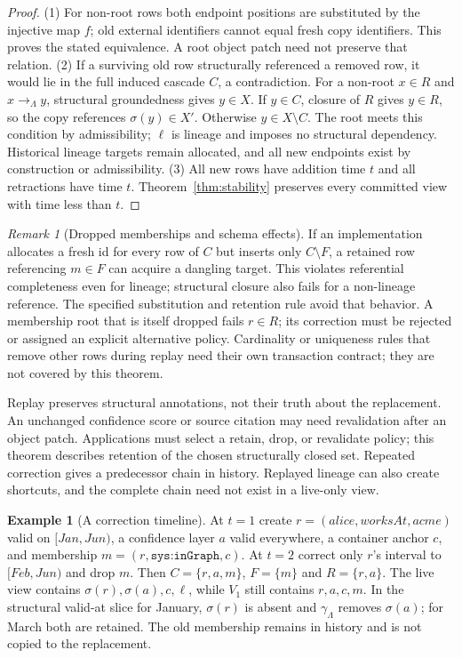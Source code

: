 \documentclass[11pt]{article}
\theoremstyle{plain}
\theoremstyle{definition}
\newtheorem{example}{Example}
\theoremstyle{remark}
\newtheorem{remark}{Remark}
\newcommand{\refs}{\rightarrow}          %
\newcommand{\core}{\gamma}               %
\newcommand{\sys}[1]{\texttt{sys:#1}}
\newcommand{\Lin}{\Lambda}               %
\begin{document}
\begin{proof}
(1) For non-root rows both endpoint positions are substituted by the injective
map $f$; old external identifiers cannot equal fresh copy identifiers. This
proves the stated equivalence. A root object patch need not preserve that relation.
(2) If a surviving old row structurally referenced a removed row, it would lie
in the full induced cascade $C$, a contradiction. For a non-root $x\in R$ and
$x\refs_{\Lin}y$, structural groundedness gives $y\in X$. If $y\in C$, closure
of $R$ gives $y\in R$, so the copy references $\sigma(y)\in X'$. Otherwise
$y\in X\setminus C$. The root meets this condition by admissibility; $\ell$ is
lineage and imposes no structural dependency. Historical lineage targets remain
allocated, and all new endpoints exist by construction or admissibility.
(3) All new rows have addition time $t$ and all retractions have time $t$.
Theorem~\ref{thm:stability} preserves every committed view with time less than $t$.
\end{proof}

\begin{remark}[Dropped memberships and schema effects]
If an implementation allocates a fresh id for every row of $C$ but inserts only
$C\setminus F$, a retained row referencing $m\in F$ can acquire a dangling target.
This violates referential completeness even for lineage; structural closure also
fails for a non-lineage reference. The specified substitution and retention rule
avoid that behavior. A membership root that is itself dropped fails $r\in R$;
its correction must be rejected or assigned an explicit alternative policy.
Cardinality or uniqueness rules that remove other rows during replay need their
own transaction contract; they are not covered by this theorem.
\end{remark}

Replay preserves structural annotations, not their truth about the replacement.
An unchanged confidence score or source citation may need revalidation after an
object patch. Applications must select a retain, drop, or revalidate policy;
this theorem describes retention of the chosen structurally closed set.
Repeated correction gives a predecessor chain in history. Replayed lineage
can also create shortcuts, and the complete chain need not exist in a live-only view.

\begin{example}[A correction timeline]
At $t=1$ create $r=(alice,worksAt,acme)$ valid on $[Jan,Jun)$, a confidence layer
$a$ valid everywhere, a container anchor $c$, and membership $m=(r,\sys{inGraph},c)$.
At $t=2$ correct only $r$'s interval to $[Feb,Jun)$ and drop $m$. Then
$C=\{r,a,m\}$, $F=\{m\}$ and $R=\{r,a\}$. The live view contains
$\sigma(r),\sigma(a),c,\ell$, while $V_1$ still contains $r,a,c,m$.
In the structural valid-at slice for January, $\sigma(r)$ is absent and
$\core_{\Lin}$ removes $\sigma(a)$; for March both are retained. The old
membership remains in history and is not copied to the replacement.
\end{example}
\end{document}
